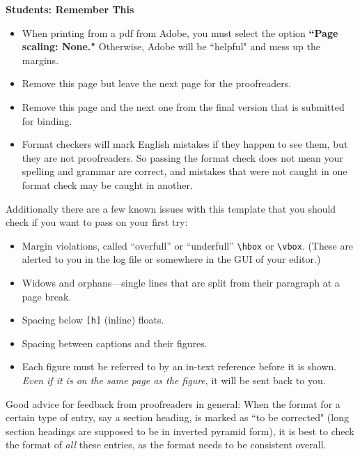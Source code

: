 \thispagestyle{empty}


\begin{singlespace}

\centerline{\bf \Large Students: Remember This}

\smallskip

\begin{itemize}
	\item When printing from a pdf from Adobe, you must select the option {\bf``Page scaling: None."}
	Otherwise, Adobe will be ``helpful" and mess up the margins.
	
	\item Remove this page but leave the next page for the proofreaders.
	
	\item Remove this page and the next one from the final version that is submitted for binding.
	
	\item Format checkers will mark English mistakes if they happen to see them, but they are not proofreaders.
	So passing the format check does not mean your spelling and grammar are correct, and mistakes that were not caught in one format check may be caught in another.
\end{itemize}
\smallskip
\noindent Additionally there are a few known issues with this template that you should check if you want to pass on your first try:
\smallskip
\begin{itemize}
	\item Margin violations, called ``overfull'' or ``underfull'' \verb+\hbox+ or \verb+\vbox+.
	(These are alerted to you in the log file or somewhere in the GUI of your editor.)
	
	\item Widows and orphans---single lines that are split from their paragraph at a page break.
	
	\item Spacing below \verb+[h]+ (inline) floats.
	
	\item Spacing between captions and their figures.
	
	\item Each figure must be referred to by an in-text reference before it is shown.
	\emph{Even if it is on the same page as the figure}, it will be sent back to you.
\end{itemize}

\smallskip
\noindent Good advice for feedback from proofreaders in general:
When the format for a certain type of entry, say a section heading,
is marked as ``to be corrected" (long section headings are supposed
to be in inverted pyramid form), it is best to
check the format of {\em all} these entries, as
the format needs to be
consistent overall.


\end{singlespace}





